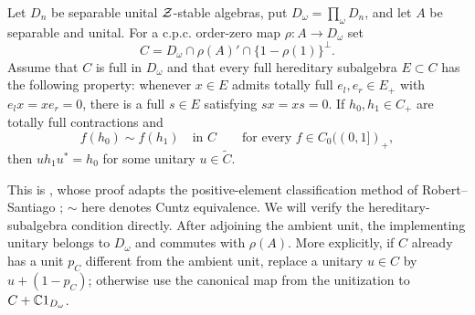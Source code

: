 \begin{lemma}
\label{prelim:unitary}
Let $D_n$ be separable unital $\mathcal Z$-stable algebras, put
$D_\omega=\prod_\omega D_n$, and let $A$ be separable and unital.
For a c.p.c. order-zero map $\rho:A\to D_\omega$ set
\[
 C=D_\omega\cap\rho(A)'\cap\{1-\rho(1)\}^{\perp}.
\]
Assume that $C$ is full in $D_\omega$ and that every full hereditary
subalgebra $E\subset C$ has the following property:
whenever $x\in E$ admits totally full $e_l,e_r\in E_+$ with
$e_lx=xe_r=0$, there is a full $s\in E$ satisfying $sx=xs=0$.
If $h_0,h_1\in C_+$ are totally full contractions and
\[
 f(h_0)\sim f(h_1)\quad\text{in }C
 \qquad\text{for every }f\in C_0((0,1])_+,
\]
then $uh_1u^*=h_0$ for some unitary $u\in\widetilde C$.
\end{lemma}

This is \cite[Lemma~5.3]{BBSTWW}, whose proof adapts the
positive-element classification method of Robert--Santiago \cite{RS};
$\sim$ here denotes Cuntz equivalence.  We will verify the hereditary-subalgebra condition
directly.  After adjoining the ambient unit, the implementing unitary
belongs to $D_\omega$ and commutes with $\rho(A)$.  More explicitly,
if $C$ already has a unit $p_C$ different from the ambient unit, replace
a unitary $u\in C$ by $u+(1-p_C)$; otherwise use the canonical map
from the unitization to $C+\mathbb C1_{D_\omega}$.
